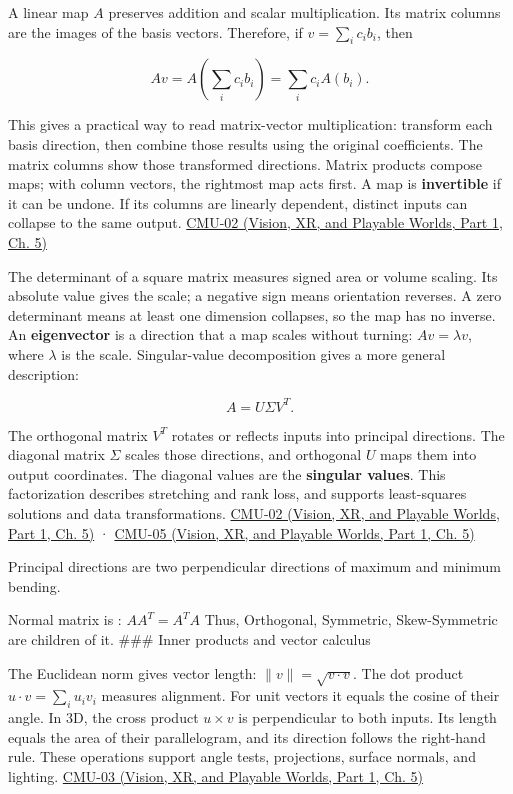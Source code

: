 A linear map \(A\) preserves addition and scalar multiplication. Its matrix columns are the images of the basis vectors. Therefore, if \(v=\sum_i c_i b_i\), then

\[
Av=A\left(\sum_i c_i b_i\right)=\sum_i c_iA(b_i).
\]

This gives a practical way to read matrix-vector multiplication: transform each basis direction, then combine those results using the original coefficients. The matrix columns show those transformed directions. Matrix products compose maps; with column vectors, the rightmost map acts first. A map is \textbf{invertible} if it can be undone. If its columns are linearly dependent, distinct inputs can collapse to the same output. \href{../07-Vision-XR-and-Playable-Worlds-P01/main.pdf\#04-visual-computing-ii-ch036-cmu-02---linear-algebra-preview}{CMU-02 (Vision, XR, and Playable Worlds, Part 1, Ch. 5)}

The determinant of a square matrix measures signed area or volume scaling. Its absolute value gives the scale; a negative sign means orientation reverses. A zero determinant means at least one dimension collapses, so the map has no inverse. An \textbf{eigenvector} is a direction that a map scales without turning: \(Av=\lambda v\), where \(\lambda\) is the scale. Singular-value decomposition gives a more general description:

\[
A=U\Sigma V^T.
\]

The orthogonal matrix \(V^T\) rotates or reflects inputs into principal directions. The diagonal matrix \(\Sigma\) scales those directions, and orthogonal \(U\) maps them into output coordinates. The diagonal values are the \textbf{singular values}. This factorization describes stretching and rank loss, and supports least-squares solutions and data transformations. \href{../07-Vision-XR-and-Playable-Worlds-P01/main.pdf\#04-visual-computing-ii-ch036-cmu-02---linear-algebra-preview}{CMU-02 (Vision, XR, and Playable Worlds, Part 1, Ch. 5)} · \href{../07-Vision-XR-and-Playable-Worlds-P01/main.pdf\#04-visual-computing-ii-ch036-cmu-05---spatial-transformations}{CMU-05 (Vision, XR, and Playable Worlds, Part 1, Ch. 5)}

Principal directions are two perpendicular directions of maximum and minimum bending.

Normal matrix is : \(AA^T = A^T A\) Thus, Orthogonal, Symmetric, Skew-Symmetric are children of it. \#\#\# Inner products and vector calculus

The Euclidean norm gives vector length: \(\|v\|=\sqrt{v\cdot v}\). The dot product \(u\cdot v=\sum_i u_iv_i\) measures alignment. For unit vectors it equals the cosine of their angle. In 3D, the cross product \(u\times v\) is perpendicular to both inputs. Its length equals the area of their parallelogram, and its direction follows the right-hand rule. These operations support angle tests, projections, surface normals, and lighting. \href{../07-Vision-XR-and-Playable-Worlds-P01/main.pdf\#04-visual-computing-ii-ch036-cmu-03---vector-calculus-preview}{CMU-03 (Vision, XR, and Playable Worlds, Part 1, Ch. 5)}

